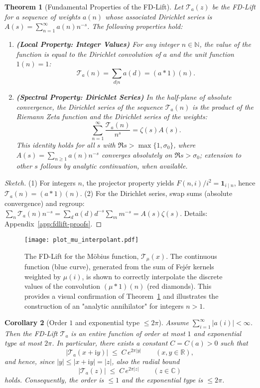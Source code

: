 \documentclass[11pt,a4paper]{amsart}
\newcommand{\C}{\mathbb{C}}
\newcommand{\R}{\mathbb{R}}
\newcommand{\N}{\mathbb{N}}
\newcommand{\ii}{\mathrm{i}}
\theoremstyle{plain}
\newtheorem{theorem}{Theorem}[section]
\newtheorem{corollary}[theorem]{Corollary}
\theoremstyle{definition}
\theoremstyle{remark}
\begin{document}
\begin{theorem}[Fundamental Properties of the FD-Lift]\label{thm:fd-lift-core}
Let $\mathcal{T}_a(z)$ be the FD-Lift for a sequence of weights $a(n)$ whose associated Dirichlet series is $A(s) = \sum_{n=1}^\infty a(n)n^{-s}$. The following properties hold:
\begin{enumerate}
    \item \textbf{(Local Property: Integer Values)} For any integer $n \in \N$, the value of the function is equal to the Dirichlet convolution of $a$ and the unit function $1(n)=1$:
    \[
    \mathcal{T}_a(n) = \sum_{d|n} a(d) = (a*1)(n).
    \]
    \item \textbf{(Spectral Property: Dirichlet Series)} In the half-plane of absolute convergence, the Dirichlet series of the sequence $\mathcal{T}_a(n)$ is the product of the Riemann Zeta function and the Dirichlet series of the weights:
    \[
    \sum_{n=1}^{\infty}\frac{\mathcal{T}_a(n)}{n^s} = \zeta(s)A(s).
    \]
    This identity holds for all $s$ with $\Re s>\max\{1,\sigma_0\}$, where $A(s)=\sum_{n\ge1} a(n)n^{-s}$ converges absolutely on $\Re s>\sigma_0$; extension to other $s$ follows by analytic continuation, when available.
\end{enumerate}
\end{theorem}
\begin{proof}[Sketch]
(1) For integers $n$, the projector property yields $F(n,i)/i^2=\mathbf{1}_{i\mid n}$, hence $\mathcal T_a(n)=(a*1)(n)$.
(2) For the Dirichlet series, swap sums (absolute convergence) and regroup: $\sum_n \mathcal T_a(n)n^{-s}
= \sum_d a(d)d^{-s}\sum_m m^{-s} = A(s)\zeta(s)$.
Details: Appendix~\ref{app:fdlift-proofs}.
\end{proof}

\begin{figure}[t]
\centering
\texttt{[image: plot\_mu\_interpolant.pdf]}
\caption{The FD-Lift for the M\"obius function, $\mathcal{T}_\mu(x)$. The continuous function (blue curve), generated from the sum of Fej\'er kernels weighted by $\mu(i)$, is shown to correctly interpolate the discrete values of the convolution $(\mu*1)(n)$ (red diamonds). This provides a visual confirmation of Theorem~\ref{thm:fd-lift-core} and illustrates the construction of an "analytic annihilator" for integers $n>1$.}
\label{fig:mu_interpolant}
\end{figure}

\FloatBarrier 

\begin{corollary}[Order $1$ and exponential type $\le 2\pi$]
Assume $\sum_{i=1}^{\infty} |a(i)| < \infty$. Then the FD-Lift $\mathcal{T}_a$ is an entire function of order at most $1$ and exponential type at most $2\pi$. In particular, there exists a constant $C=C(a)>0$ such that
\[
|\mathcal{T}_a(x+\ii y)| \;\le\; C\, e^{2\pi |y|} \qquad (x,y\in\R),
\]
and hence, since $|y|\le |x+\ii y|=|z|$, also the radial bound
\[
|\mathcal{T}_a(z)| \;\le\; C\, e^{2\pi |z|} \qquad (z\in\C)
\]
holds. Consequently, the order is $\le 1$ and the exponential type is $\le 2\pi$.
\end{corollary}
\end{document}
